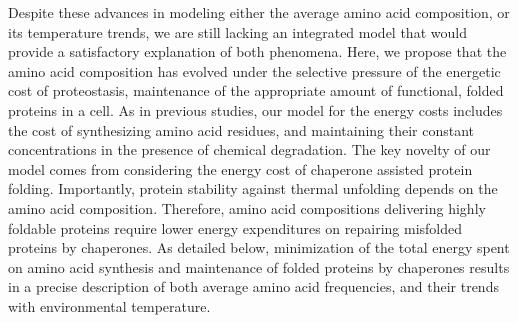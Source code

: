 \documentclass[10pt,letterpaper]{article}
\begin{document}
Despite these advances in modeling either the average amino acid composition, or its temperature trends, we are still lacking an integrated model that would provide a satisfactory explanation of both phenomena. Here, we propose that the amino acid composition has evolved under the selective pressure of the energetic cost of proteostasis, maintenance of the appropriate amount of functional, folded proteins in a cell. As in previous studies, our model for the energy costs includes the cost of synthesizing amino acid residues, and maintaining their constant concentrations in the presence of chemical degradation. The key novelty of our model comes from considering the energy cost of chaperone assisted protein folding. Importantly, protein stability against thermal unfolding depends on the amino acid composition. Therefore, amino acid compositions delivering highly foldable proteins require lower energy expenditures on repairing misfolded proteins by chaperones. As detailed below, minimization of the total energy spent on amino acid synthesis and maintenance of folded proteins by chaperones results in a precise description of both average amino acid frequencies, and their trends with environmental temperature.





\end{document}
